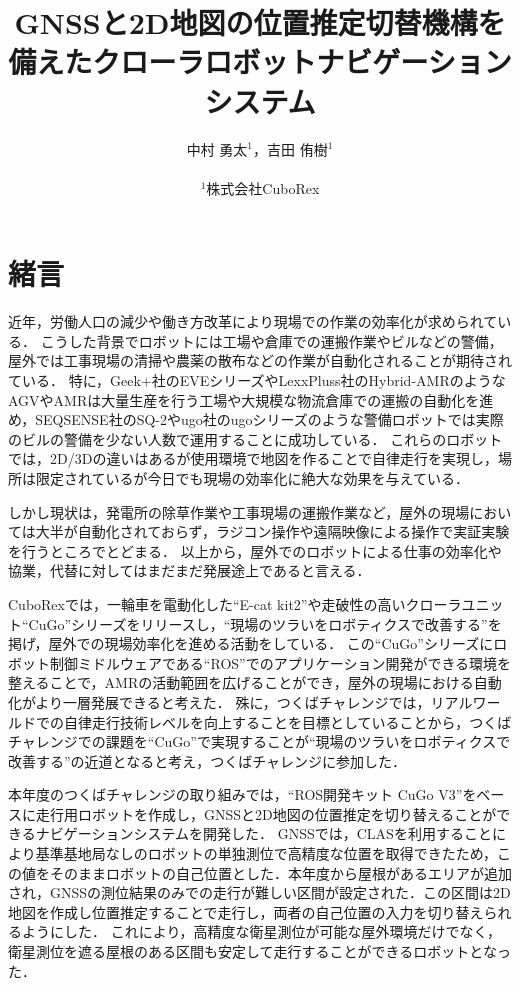 \documentclass[platex,dvipdfmx]{rbproceedings}
\title{GNSSと2D地図の位置推定切替機構を備えたクローラロボットナビゲーションシステム}
\author{%
中村 勇太${}^{1}$，吉田 侑樹${}^{1}$\\ \\
${}^{1}$株式会社CuboRex
}
\begin{document}
\maketitle


\section{緒言}
近年，労働人口の減少や働き方改革により現場での作業の効率化が求められている．
こうした背景でロボットには工場や倉庫での運搬作業やビルなどの警備，屋外では工事現場の清掃や農薬の散布などの作業が自動化されることが期待されている．
特に，Geek+社のEVEシリーズ\cite{geek_plus}やLexxPluss社のHybrid-AMR\cite{lexxpluss}のようなAGVやAMRは大量生産を行う工場や大規模な物流倉庫での運搬の自動化を進め，SEQSENSE社のSQ-2\cite{seqsense}やugo社のugoシリーズ\cite{ugo}のような警備ロボットでは実際のビルの警備を少ない人数で運用することに成功している．
これらのロボットでは，2D/3Dの違いはあるが使用環境で地図を作ることで自律走行を実現し，場所は限定されているが今日でも現場の効率化に絶大な効果を与えている．

しかし現状は，発電所の除草作業や工事現場の運搬作業など，屋外の現場においては大半が自動化されておらず，ラジコン操作や遠隔映像による操作で実証実験を行うところでとどまる．
以上から，屋外でのロボットによる仕事の効率化や協業，代替に対してはまだまだ発展途上であると言える．

CuboRexでは，一輪車を電動化した“E-cat kit2”\cite{e_cat}や走破性の高いクローラユニット“CuGo”シリーズ\cite{cugo}をリリースし，“現場のツラいをロボティクスで改善する”を掲げ，屋外での現場効率化を進める活動をしている．
この“CuGo”シリーズにロボット制御ミドルウェアである“ROS”でのアプリケーション開発ができる環境を整えることで，AMRの活動範囲を広げることができ，屋外の現場における自動化がより一層発展できると考えた．
殊に，つくばチャレンジでは，リアルワールドでの自律走行技術レベルを向上することを目標としていることから，つくばチャレンジでの課題を“CuGo”で実現することが“現場のツラいをロボティクスで改善する”の近道となると考え，つくばチャレンジに参加した．

本年度のつくばチャレンジの取り組みでは，“ROS開発キット CuGo V3”\cite{cugo_ros}をベースに走行用ロボットを作成し，GNSSと2D地図の位置推定を切り替えることができるナビゲーションシステムを開発した．
GNSSでは，CLAS\cite{clas}を利用することにより基準基地局なしのロボットの単独測位で高精度な位置を取得できたため，この値をそのままロボットの自己位置とした．本年度から屋根があるエリアが追加され，GNSSの測位結果のみでの走行が難しい区間が設定された．この区間は2D地図を作成し位置推定することで走行し，両者の自己位置の入力を切り替えられるようにした．
これにより，高精度な衛星測位が可能な屋外環境だけでなく，衛星測位を遮る屋根のある区間も安定して走行することができるロボットとなった．
\end{document}
